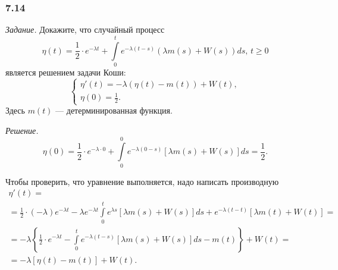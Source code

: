 \subsubsection*{7.14}

\textit{Задание.}
Докажите, что случайный процесс
$$ \eta \left( t \right) =
  \frac{1}{2} \cdot e^{-\lambda t} +
  \int \limits_0^t
    e^{-\lambda \left( t - s \right) } \left( \lambda m \left( s \right) +
    W \left( s \right) \right) ds, \,
  t \geq 0$$
является решением задачи Коши:
$$ \begin{cases}
    \eta' \left( t \right) =
    -\lambda \left( \eta \left( t \right) - m \left( t \right) \right) + W \left( t \right), \\
    \eta \left( 0 \right) = \frac{1}{2}.
  \end{cases}$$
Здесь $m \left( t \right) $ --- детерминированная функция.

\textit{Решение.}
$$ \eta \left( 0 \right) =
  \frac{1}{2} \cdot e^{-\lambda \cdot 0} +
  \int \limits_0^0
    e^{-\lambda \left( 0 -s \right) } \left[ \lambda m \left( s \right) + W \left( s \right) \right]
  ds =
  \frac{1}{2}.$$

Чтобы проверить, что уравнение выполняется, надо написать производную
\begin{gather*}
  \eta' \left( t \right) = \\
  = \frac{1}{2} \cdot \left( -\lambda \right) e^{-\lambda t} -
  \lambda e^{-\lambda t} \int \limits_0^t
    e^{ \lambda s} \left[ \lambda m \left( s \right) + W \left( s \right) \right] ds +
  e^{-\lambda \left( t - t \right) }
  \left[ \lambda m \left( t \right) + W \left( t \right) \right] = \\
  = -\lambda \left\{
    \frac{1}{2} \cdot e^{-\lambda t} -
    \int \limits_0^t
      e^{-\lambda \left( t - s \right) }
      \left[ \lambda m \left( s \right) + W \left( s \right) \right]
    ds - m \left( t \right)
  \right\} + W \left( t \right) = \\
  = -\lambda \left[ \eta \left( t \right) - m \left( t \right) \right] + W \left( t \right).
\end{gather*}
